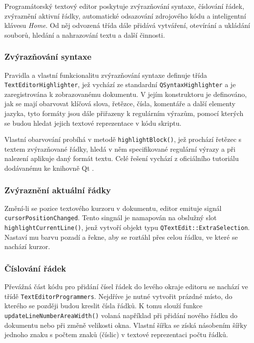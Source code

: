 \documentclass[11pt,twoside,a4paper]{book}
\begin{document}
Programátorský textový editor poskytuje zvýrazňování syntaxe, číslování řádek, zvýraznění aktivní řádky, automatické odsazování zdrojového kódu a inteligentní klávesu \textit{Home}. Od něj odvozená třída dále přidává vytváření, otevírání a ukládání souborů, hledání a nahrazování textu a další činnosti.


\subsubsection{Zvýrazňování syntaxe}

Pravidla a vlastní funkcionalitu zvýrazňování syntaxe definuje třída \texttt{Text\-E\-di\-tor\-High\-ligh\-ter}, jež vychází ze standardní \texttt{QSyntaxHighlighter} a je zaregistrována k zobrazovanému dokumentu. V jejím konstruktoru je definováno, jak se mají obarvovat klíčová slova, řetězce, čísla, komentáře a další elementy jazyka, tyto formáty jsou dále přiřazeny k regulárním výrazům, pomocí kterých se budou hledat jejich textové reprezentace v kódu skriptu.

Vlastní obarvování probíhá v metodě \texttt{highlightBlock()}, jež prochází řetězec s textem zvýrazňované řádky, hledá v něm specifikované regulární výrazy a při nalezení aplikuje daný formát textu. Celé řešení vychází z oficiálního tutoriálu dodávanému ke knihovně Qt \cite{syntax_highlighter_example}.


\subsubsection{Zvýraznění aktuální řádky}

Změní-li se pozice textového kurzoru v dokumentu, editor emituje signál \texttt{cur\-sor\-Po\-si\-ti\-on\-Chan\-ged}. Tento singnál je namapován na obslužný slot \texttt{highlightCurrentLine()}, jenž vytvoří objekt typu \texttt{QTextEdit::ExtraSelection}. Nastaví mu barvu pozadí a řekne, aby se roztáhl přes celou řádku, ve které se nachází kurzor.


\subsubsection{Číslování řádek}

Převážná část kódu pro přidání čísel řádek do levého okraje editoru se nachází ve třídě \texttt{TextEditorProgrammers}. Nejdříve je nutné vytvořit prázdné místo, do kterého se později budou kreslit čísla řádků. K tomu slouží funkce \texttt{updateLineNumberAreaWidth()} volaná například při přidání nového řádku do dokumentu nebo při změně velikosti okna. Vlastní šířka se získá násobením šířky jednoho znaku s počtem znaků (číslic) v textové reprezentaci počtu řádků.
\end{document}
